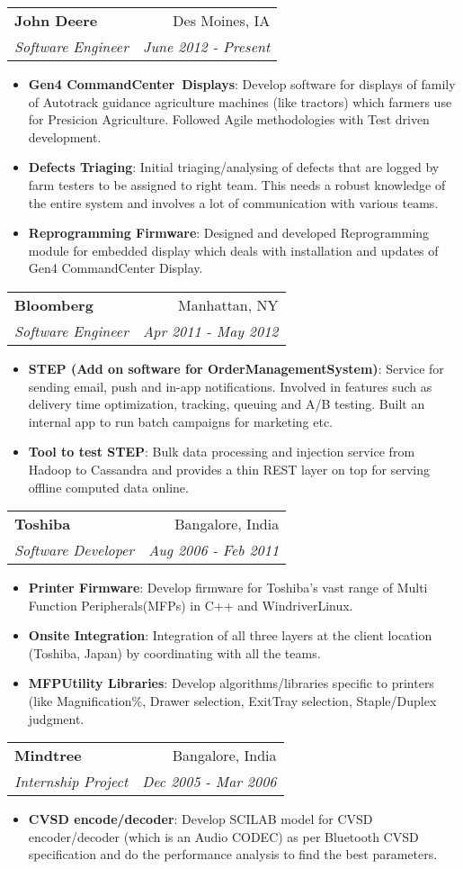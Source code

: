 \documentclass[letterpaper,11pt]{article}
\makeatletter
\newcommand{\resumeItem}[2]{
  \item\small{
    \textbf{#1}{: #2 \vspace{-2pt}}
  }
}
\newcommand{\resumeSubheading}[4]{
  \vspace{-1pt}\item
    \begin{tabular*}{0.97\textwidth}[t]{l@{\extracolsep{\fill}}r}
      \textbf{#1} & #2 \\
      \textit{\small#3} & \textit{\small #4} \\
    \end{tabular*}\vspace{-5pt}
}
\newcommand{\resumeItemListStart}{\begin{itemize}}
\newcommand{\resumeItemListEnd}{\end{itemize}\vspace{-5pt}}
\makeatother
\begin{document}
    \resumeSubheading
      {John Deere}{Des Moines, IA}
      {Software Engineer}{June 2012 - Present}
      \resumeItemListStart
        \resumeItem{Gen4 CommandCenter\texttrademark\ Displays}
          {Develop software for displays of family of Autotrack guidance agriculture machines (like tractors) which farmers use for Presicion Agriculture. Followed Agile methodologies with Test driven development.}
        \resumeItem{Defects Triaging}
          {Initial triaging/analysing of defects that are logged by farm testers to be assigned to right team. This needs a robust knowledge of the entire system and involves a lot of communication with various teams.}
        \resumeItem{Reprogramming Firmware}
          {Designed and developed Reprogramming module for embedded display which deals with installation and updates of Gen4 CommandCenter Display.}
      \resumeItemListEnd

    \resumeSubheading
      {Bloomberg}{Manhattan, NY}
      {Software Engineer}{Apr 2011 - May 2012}
      \resumeItemListStart
        \resumeItem{STEP (Add on software for OrderManagementSystem)}
          {Service for sending email, push and in-app notifications. Involved in features such as delivery time optimization, tracking, queuing and A/B testing. Built an internal app to run batch campaigns for marketing etc.}
        \resumeItem{Tool to test STEP}
          {Bulk data processing and injection service from Hadoop to Cassandra and provides a thin REST layer on top for serving offline computed data online.}
      \resumeItemListEnd

    \resumeSubheading
      {Toshiba}{Bangalore, India}
      {Software Developer}{Aug 2006 - Feb 2011}
      \resumeItemListStart
        \resumeItem{Printer Firmware}
          {Develop firmware for Toshiba's vast range of Multi Function Peripherals(MFPs) in C++ and WindriverLinux.}
        \resumeItem{Onsite Integration}
          {Integration of all three layers at the client location (Toshiba, Japan) by coordinating with all the teams.}
        \resumeItem{MFPUtility Libraries}
          {Develop algorithms/libraries specific to printers (like Magnification\%, Drawer selection, ExitTray selection, Staple/Duplex judgment.}
      \resumeItemListEnd

    \resumeSubheading
      {Mindtree}{Bangalore, India}
      {Internship Project}{Dec 2005 - Mar 2006}
      \resumeItemListStart
\begin{comment}
Developing SCILAB model CVSD encoder/decoder for Bluetooth: 
\end{comment}
        \resumeItem{CVSD encode/decoder}
          {Develop SCILAB model for CVSD encoder/decoder (which is an Audio CODEC) as per Bluetooth CVSD specification and do the performance analysis to find the best parameters.}
      \resumeItemListEnd
\end{document}

